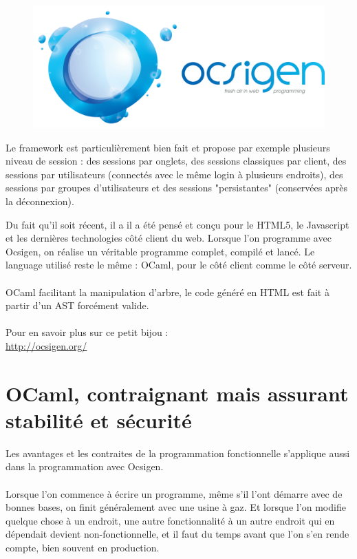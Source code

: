 \documentclass{life-fr}
\begin{document}
\begin{figure}[H]
  \begin{center}
    \includegraphics[width=13cm]{img/ocsigen.png}
  \end{center}
\end{figure}

Le framework est particulièrement bien fait et propose par exemple plusieurs niveau de session : des sessions par onglets, des sessions classiques par client, des sessions par utilisateurs (connectés avec le même login à plusieurs endroits), des sessions par groupes d'utilisateurs et des sessions "persistantes" (conservées après la déconnexion).\\

\newpage

Du fait qu'il soit récent, il a  il a été pensé et conçu pour le HTML5, le Javascript et les dernières technologies côté client du web. Lorsque l'on programme avec Ocsigen, on réalise un véritable programme complet, compilé et lancé. Le language utilisé reste le même : OCaml, pour le côté client comme le côté serveur.\\
\\
OCaml facilitant la manipulation d'arbre, le code généré en HTML est fait à partir d'un AST forcément valide.\\
\\
Pour en savoir plus sur ce petit bijou :\\
\url{http://ocsigen.org/}

\section{OCaml, contraignant mais assurant stabilité et sécurité}

Les avantages et les contraites de la programmation fonctionnelle s'applique aussi dans la programmation avec Ocsigen.\\
\\
Lorsque l'on commence à écrire un programme, même s'il l'ont démarre avec de bonnes bases, on finit généralement avec une usine à gaz. Et lorsque l'on modifie quelque chose à un endroit, une autre fonctionnalité à un autre endroit qui en dépendait devient non-fonctionnelle, et il faut du temps avant que l'on s'en rende compte, bien souvent en production.\\
\end{document}
